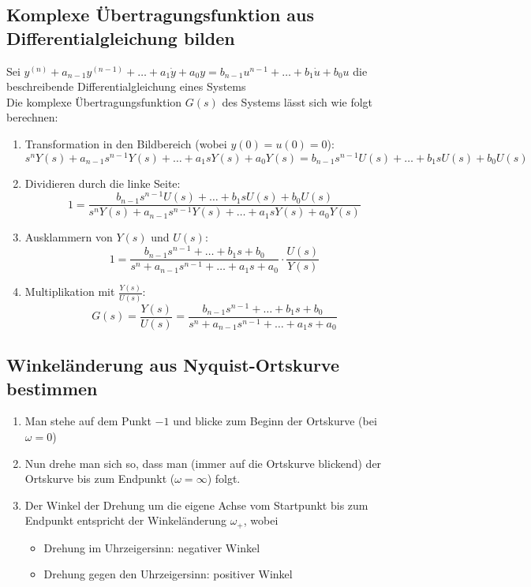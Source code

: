 \documentclass[10pt,a4paper]{article}
\begin{document}

\subsection{Komplexe Übertragungsfunktion aus Differentialgleichung bilden}
Sei $y^{(n)} + a_{n-1} y^{(n-1)} + \dots + a_1 \dot y + a_0 y = b_{n-1} u^{n-1} + \dots + b_1 \dot u + b_0 u$ die beschreibende Differentialgleichung eines Systems \\
Die komplexe Übertragungsfunktion $G(s)$ des Systems lässt sich wie folgt berechnen:
\begin{enumerate}
	\item Transformation in den Bildbereich (wobei $y(0) = u(0) = 0$):
	$$
		s^nY(s) + a_{n-1}s^{n-1} Y(s) + \dots + a_1 s Y(s) + a_0 Y(s) = b_{n-1} s^{n-1} U(s) + \dots + b_1 s U(s) + b_0 U(s)
	$$
	\item Dividieren durch die linke Seite:
	$$
		1 = \frac {b_{n-1} s^{n-1} U(s) + \dots + b_1 s U(s) + b_0 U(s)} {s^nY(s) + a_{n-1}s^{n-1} Y(s) + \dots + a_1 s Y(s) + a_0 Y(s)}
	$$
	\item Ausklammern von $Y(s)$ und $U(s)$:
	$$
		1 = \frac {b_{n-1} s^{n-1} + \dots + b_1 s + b_0} {s^n + a_{n-1}s^{n-1} + \dots + a_1 s + a_0} ⋅ \frac{U(s)}{Y(s)}
	$$
	\item Multiplikation mit $\frac{Y(s)}{U(s)}$:
	$$
		G(s) = \frac{Y(s)}{U(s)} = \frac {b_{n-1} s^{n-1} + \dots + b_1 s + b_0} {s^n + a_{n-1}s^{n-1} + \dots + a_1 s + a_0}
	$$
\end{enumerate}

\subsection{Winkeländerung aus Nyquist-Ortskurve bestimmen}
\begin{enumerate}
	\item Man stehe auf dem Punkt $-1$ und blicke zum Beginn der Ortskurve (bei $\omega = 0$)
	\item Nun drehe man sich so, dass man (immer auf die Ortskurve blickend) der Ortskurve bis zum Endpunkt ($\omega = ∞$) folgt.
	\item Der Winkel der Drehung um die eigene Achse vom Startpunkt bis zum Endpunkt entspricht der Winkeländerung $\omega_+$, wobei
	\begin{itemize}
		\item Drehung im Uhrzeigersinn: negativer Winkel
		\item Drehung gegen den Uhrzeigersinn: positiver Winkel
	\end{itemize}
\end{enumerate}
\end{document}
